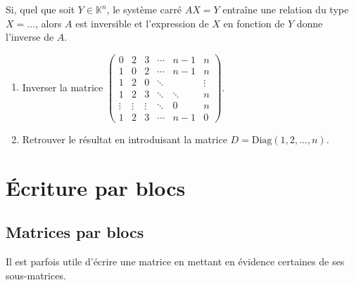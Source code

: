 \documentclass[french]{article}
\newcommand{\K}{\mathbb{K}}
\theoremstyle{plain}
\theoremstyle{definition}
\theoremstyle{remark}
\begin{document}
\begin{met}
	Si, quel que soit $Y\in\K^n$, le système carré $AX=Y$ entraîne une relation du type $X=\ldots$, alors $A$ est inversible et l'expression de $X$ en fonction de $Y$ donne l'inverse de $A$.
\end{met}

\begin{exo}
	\begin{enumerate}
		\item Inverser la matrice $\begin{pmatrix}
			0&2&3&\cdots&n-1&n\\
			1&0&2&\cdots&n-1&n\\
			1&2&0&\ddots&&\vdots\\
			1&2&3&\ddots&\ddots&n\\
			\vdots&\vdots&\vdots&\ddots&0&n\\
			1&2&3&\cdots&n-1&0
		\end{pmatrix}$.
		\item Retrouver le résultat en introduisant la matrice $D=\text{Diag}(1,2,\ldots,n)$.
	\end{enumerate}
\end{exo}

\section{Écriture par blocs}

\subsection{Matrices par blocs}

Il est parfois utile d'écrire une matrice en mettant en évidence certaines de ses sous-matrices.
\end{document}
